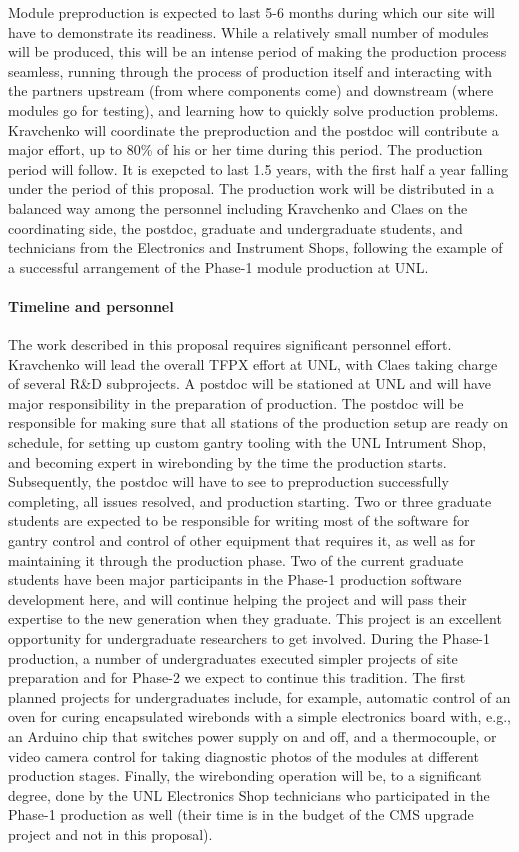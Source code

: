Module preproduction is expected to last 5-6 months during which our site will have to demonstrate its readiness. While a relatively small number of modules will be produced, this will be an intense period of making the production process seamless, running through the process of production itself and interacting with the partners upstream (from where components come) and downstream (where modules go for testing), and learning how to quickly solve production problems. Kravchenko will coordinate the preproduction and the postdoc will contribute a major effort, up to 80\% of his or her time during this period. The production period will follow. It is exepcted to last 1.5 years, with the first half a year falling under the period of this proposal. The production work will be distributed in a balanced way among the personnel including Kravchenko and Claes on the coordinating side, the postdoc, graduate and undergraduate students, and technicians from the Electronics and Instrument Shops, following the example of a successful arrangement of the Phase-1 module production at UNL.

\paragraph{Timeline and personnel}

The work described in this proposal requires significant personnel effort. Kravchenko will lead the overall TFPX effort at UNL, with Claes taking charge of several R\&D subprojects. A postdoc will be stationed at UNL and will have major responsibility in the preparation of production. The postdoc will be responsible for making sure that all stations of the production setup are ready on schedule, for setting up custom gantry tooling with the UNL Intrument Shop, and becoming expert in wirebonding by the time the production starts. Subsequently, the postdoc will have to see to preproduction successfully completing, all issues resolved, and production starting. Two or three graduate students are expected to be responsible for writing most of the software for gantry control and control of other equipment that requires it, as well as for maintaining it through the production phase. Two of the current graduate students have been major participants in the Phase-1 production software development here, and will continue helping the project and will pass their expertise to the new generation when they graduate. This project is an excellent opportunity for undergraduate researchers to get involved. During the Phase-1 production, a number of undergraduates executed simpler projects of site preparation and for Phase-2 we expect to continue this tradition. The first planned projects for undergraduates include, for example, automatic control of an oven for curing encapsulated wirebonds with a simple electronics board with, e.g., an Arduino chip that switches power supply on and off, and a thermocouple, or video camera control for taking diagnostic photos of the modules at different production stages. Finally, the wirebonding operation will be, to a significant degree, done by the UNL Electronics Shop technicians who participated in the Phase-1 production as well (their time is in the budget of the CMS upgrade project and not in this proposal).


